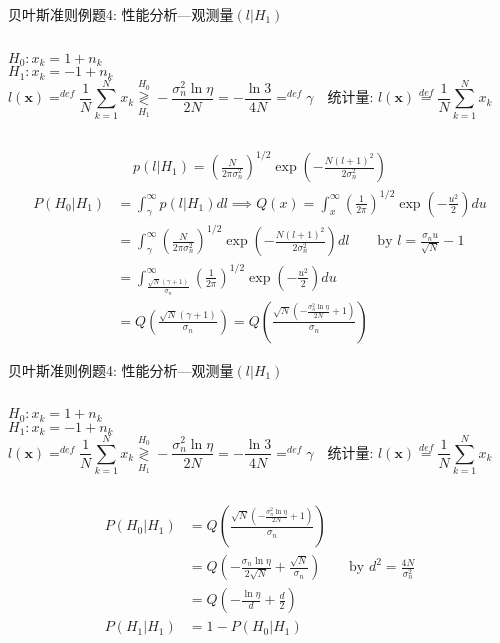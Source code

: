 \begin{frame}[shrink]{贝叶斯准则例题4: 性能分析---观测量$(l|H_1)$}
\begin{columns}
	$H_0:x_k=1+n_k$\\
	$H_1:x_k=-1+n_k$
	\[
	l(\bm{x})\mathop{=}^{def}\frac{1}{N}\sum\limits_{k=1}^{N}x_k\mathop{\gtrless}\limits_{H_1}^{H_0}-\frac{\sigma_n^2\ln\eta}{2N}=-\frac{\ln3}{4N}\mathop{=}^{def}\gamma \quad \textbf{统计量: }l(\bm{x})\mathop{=}\limits^{def}\frac{1}{N}\sum\limits_{k=1}^{N}x_k
	\]
\end{columns}
\begin{align*}
p(l|H_1)=\left(\frac{N}{2\pi\sigma_n^2}\right)^{1/2}\exp\left(-\frac{N(l+1)^2}{2\sigma_n^2}\right)
\end{align*}
\begin{align*}
P(H_0|H_1)&=\int_{\gamma}^{\infty}p(l|H_1)dl\implies Q(x)=\int_{x}^{\infty}\left(\frac{1}{2\pi}\right)^{1/2}\exp\left(-\frac{u^2}{2}\right)du\\
&=\int_{\gamma}^{\infty}\left(\frac{N}{2\pi\sigma_n^2}\right)^{1/2}\exp\left(-\frac{N(l+1)^2}{2\sigma_n^2}\right)dl\qquad \text{by } l=\frac{\sigma_nu}{\sqrt{N}}-1\\
&=\int_{\frac{\sqrt{N}(\gamma+1)}{\sigma_n}}^{\infty}\left(\frac{1}{2\pi}\right)^{1/2}\exp\left(-\frac{u^2}{2}\right)du\\
&=Q\left(\frac{\sqrt{N}(\gamma+1)}{\sigma_n}\right)=Q\left(\frac{\sqrt{N}\left(-\frac{\sigma_n^2\ln\eta}{2N}+1\right)}{\sigma_n}\right)
\end{align*}
\end{frame}

\begin{frame}[shrink]{贝叶斯准则例题4: 性能分析---观测量$(l|H_1)$}
\begin{columns}
	$H_0:x_k=1+n_k$\\
	$H_1:x_k=-1+n_k$
	\[
	l(\bm{x})\mathop{=}^{def}\frac{1}{N}\sum\limits_{k=1}^{N}x_k\mathop{\gtrless}\limits_{H_1}^{H_0}-\frac{\sigma_n^2\ln\eta}{2N}=-\frac{\ln3}{4N}\mathop{=}^{def}\gamma \quad \textbf{统计量: }l(\bm{x})\mathop{=}\limits^{def}\frac{1}{N}\sum\limits_{k=1}^{N}x_k
	\]
\end{columns}
\begin{align*}
P(H_0|H_1)&=Q\left(\frac{\sqrt{N}\left(-\frac{\sigma_n^2\ln\eta}{2N}+1\right)}{\sigma_n}\right)\\
&=Q\left(-\frac{\sigma_n\ln\eta}{2\sqrt{N}}+\frac{\sqrt{N}}{\sigma_n}\right)&& \text{by }d^2=\frac{4N}{\sigma_n^2}\\
&=Q\left(-\frac{\ln\eta}{d}+\frac{d}{2}\right)\\
P(H_1|H_1)&=1-P(H_0|H_1)
\end{align*}
\end{frame}

